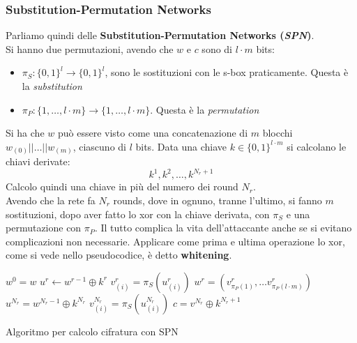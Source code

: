 \documentclass[a4paper,12pt, oneside]{book}
\begin{document}
\subsubsection{Substitution-Permutation Networks}
Parliamo quindi delle \textbf{Substitution-Permutation Networks
  (\textit{SPN})}.\\ 
Si hanno due permutazioni, avendo che $w$ e $c$ sono di $l\cdot m$ bits:
\begin{itemize}
  \item $\pi_S:\{0,1\}^l\to\{0,1\}^l$, sono le sostituzioni con le s-box
  praticamente. Questa è la \textit{substitution}
  \item $\pi_P:\{1,\ldots, l\cdot m\}\to\{1,\ldots, l\cdot m\}$. Questa è la
  \textit{permutation} 
\end{itemize}
Si ha che $w$ può essere visto come una concatenazione di $m$ blocchi
$w_{(0)}||\ldots || w_{(m)}$, ciascuno di $l$ bits. Data una chiave $k\in
\{0,1\}^{l\cdot m}$ si calcolano le chiavi derivate:
\[k^1,k^2,\ldots, k^{N_r+1}\]
Calcolo quindi una chiave in più del numero dei round $N_r$.\\
Avendo che la rete fa $N_r$ rounds, dove in ognuno, tranne l'ultimo, si fanno
$m$ sostituzioni, dopo aver fatto lo xor con la chiave derivata, con $\pi_S$ e
una permutazione con $\pi_P$. Il tutto complica la vita dell'attaccante anche se
si evitano complicazioni non necessarie. Applicare come prima e ultima
operazione lo xor, come si vede nello pseudocodice, è detto \textbf{whitening}.
\begin{algorithm}
  \begin{algorithmic}
    \State $w^0=w$
    \State $u^r\gets w^{r-1}\oplus k^r$ 
    \State $v_{(i)}^r=\pi_S(u^r_{(i)})$
    \EndFor
    \State $w^r=(v^r_{\pi_P(1)},\ldots v^r_{\pi_P(l\cdot m)})$
    \EndFor
    \State $u^{N_r}=w^{N_r-1}\oplus k^{N_r}$
    \State $v_{(i)}^{N_r}=\pi_S(u^{N_r}_{(i)})$
    \EndFor
    \State $c=v^{N_r}\oplus k^{N_r+1}$
    \EndFunction
  \end{algorithmic}
  \caption{Algoritmo per calcolo cifratura con SPN}
\end{algorithm}
\end{document}
